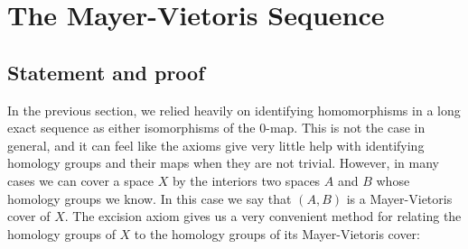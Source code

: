 \section{The Mayer-Vietoris Sequence}\label{sec-mayer-vietoris}
\subsection{Statement and proof}
In the previous section, we relied heavily on identifying homomorphisms in a long exact sequence as either isomorphisms of the $0$-map. This is not the case in general, and it can feel like the axioms give very little help with identifying homology groups and their maps when they are not trivial. However, in many cases we can cover a space $X$ by the interiors two spaces $A$ and $B$ whose homology groups we know. In this case we say that $(A,B)$ is a Mayer-Vietoris cover of $X$. The excision axiom gives us a very convenient method for relating the homology groups of $X$ to the homology groups of its Mayer-Vietoris cover:


